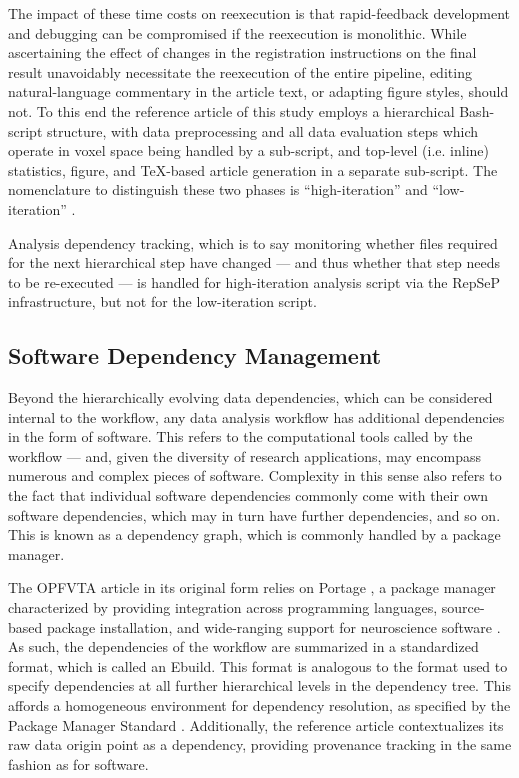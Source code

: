 The impact of these time costs on reexecution is that rapid-feedback development and debugging can be compromised if the reexecution is monolithic.
While ascertaining the effect of changes in the registration instructions on the final result unavoidably necessitate the reexecution of the entire pipeline, editing natural-language commentary in the article text, or adapting figure styles, should not.
To this end the reference article of this study employs a hierarchical Bash-script structure, with data preprocessing and all data evaluation steps which operate in voxel space being handled by a sub-script, and top-level (i.e. inline) statistics, figure, and TeX-based article generation in a separate sub-script.
The nomenclature to distinguish these two phases is “high-iteration” and “low-iteration” \cite{repsep}.

Analysis dependency tracking, which is to say monitoring whether files required for the next hierarchical step have changed — and thus whether that step needs to be re-executed — is handled for high-iteration analysis script via the RepSeP infrastructure, but not for the low-iteration script.


\subsection{Software Dependency Management}

Beyond the hierarchically evolving data dependencies, which can be considered internal to the workflow, any data analysis workflow has additional dependencies in the form of software.
This refers to the computational tools called by the workflow — and, given the diversity of research applications, may encompass numerous and complex pieces of software.
Complexity in this sense also refers to the fact that individual software dependencies commonly come with their own software dependencies, which may in turn have further dependencies, and so on.
This is known as a dependency graph, which is commonly handled by a package manager.

The OPFVTA article in its original form relies on Portage \supercite{portage}, a package manager characterized by providing integration across programming languages, source-based package installation, and wide-ranging support for neuroscience software \supercite{ng}.
As such, the dependencies of the workflow are summarized in a standardized format, which is called an Ebuild.
This format is analogous to the format used to specify dependencies at all further hierarchical levels in the dependency tree.
This affords a homogeneous environment for dependency resolution, as specified by the Package Manager Standard \supercite{pms}.
Additionally, the reference article contextualizes its raw data origin point as a dependency, providing provenance tracking in the same fashion as for software.

